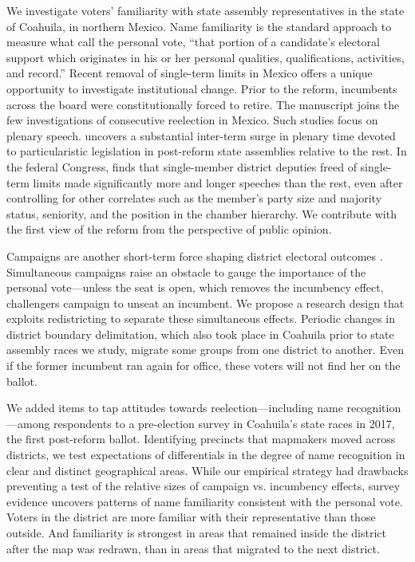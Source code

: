 \documentclass[letter,12pt]{article}
\begin{document}
We investigate voters' familiarity with state assembly representatives in the state of Coahuila, in northern Mexico. Name familiarity is the standard approach to measure what \citet[][:9]{cain.etal.1987} call the personal vote, ``that portion of a candidate's electoral support which originates in his or her personal qualities, qualifications, activities, and record.'' Recent removal of single-term limits in Mexico offers a unique opportunity to investigate institutional change. Prior to the reform, incumbents across the board were constitutionally forced to retire. The manuscript joins the few investigations of consecutive reelection in Mexico. Such studies focus on plenary speech. \citet{motolinia-reel-pork2021} uncovers a substantial inter-term surge in plenary time devoted to particularistic legislation in post-reform state assemblies relative to the rest. In the federal Congress, \citet{magar.debate.2021} finds that single-member district deputies freed of single-term limits made significantly more and longer speeches than the rest, even after controlling for other correlates such as the member's party size and majority status, seniority, and the position in the chamber hierarchy. We contribute with the first view of the reform from the perspective of public opinion.

Campaigns are another short-term force shaping district electoral outcomes \citep{downs.1957,jacobson.1990spending,popkin.1991}. Simultaneous campaigns raise an obstacle to gauge the importance of the personal vote---unless the seat is open, which removes the incumbency effect, challengers campaign to unseat an incumbent. We propose a research design that exploits redistricting to separate these simultaneous effects. Periodic changes in district boundary delimitation, which also took place in Coahuila prior to state assembly races we study, migrate some groups from one district to another. Even if the former incumbent ran again for office, these voters will not find her on the ballot.


We added items to tap attitudes towards reelection---including name recognition---among respondents to a pre-election survey in Coahuila's state races in 2017, the first post-reform ballot. Identifying precincts that mapmakers moved across districts, we test expectations of differentials in the degree of name recognition in clear and distinct geographical areas. While our empirical strategy had drawbacks preventing a test of the relative sizes of campaign vs. incumbency effects, survey evidence uncovers patterns of name familiarity consistent with the personal vote. Voters in the district are more familiar with their representative than those outside. And familiarity is strongest in areas that remained inside the district after the map was redrawn, than in areas that migrated to the next district.  
\end{document}
